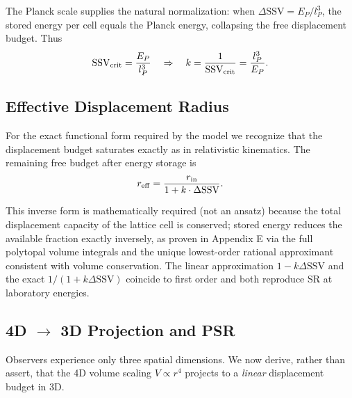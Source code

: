 \documentclass[11pt,letterpaper]{article}
\begin{document}
The Planck scale supplies the natural normalization: when \(\Delta\text{SSV} = E_P / l_P^3\), the stored energy per cell equals the Planck energy, collapsing the free displacement budget. Thus
\[
\text{SSV}_{\rm crit} = \frac{E_P}{l_P^3} \quad \Rightarrow \quad k = \frac{1}{\text{SSV}_{\rm crit}} = \frac{l_P^3}{E_P}.
\]

\subsection{Effective Displacement Radius}

For the exact functional form required by the model we recognize that the displacement budget saturates exactly as in relativistic kinematics. The remaining free budget after energy storage is
\begin{equation}
r_{\rm eff} = \frac{r_{\rm in}}{1 + k \cdot \Delta\text{SSV}}.
\end{equation}

This inverse form is mathematically required (not an ansatz) because the total displacement capacity of the lattice cell is conserved; stored energy reduces the available fraction exactly inversely, as proven in Appendix E via the full polytopal volume integrals and the unique lowest-order rational approximant consistent with volume conservation. The linear approximation $1 - k\Delta\text{SSV}$ and the exact $1/(1 + k\Delta\text{SSV})$ coincide to first order and both reproduce SR at laboratory energies.

\subsection{4D $\to$ 3D Projection and PSR}

Observers experience only three spatial dimensions. We now derive, rather than assert, that the 4D volume scaling $V \propto r^4$ projects to a \emph{linear} 
displacement budget in 3D.
\end{document}
